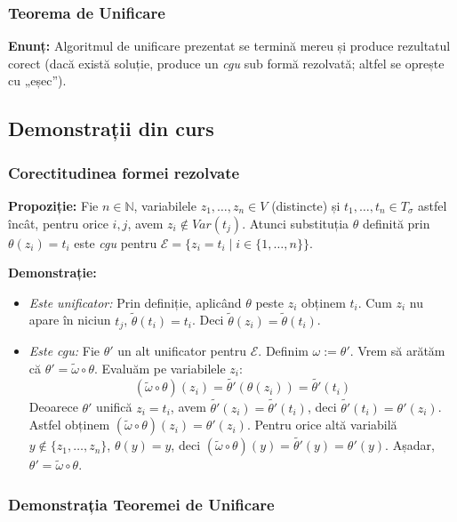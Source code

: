 \subsubsection{Teorema de Unificare}
\textbf{Enunț:} Algoritmul de unificare prezentat se termină mereu și produce rezultatul corect (dacă există soluție, produce un \textit{cgu} sub formă rezolvată; altfel se oprește cu „eșec”).

\subsection{Demonstrații din curs}

\subsubsection{Corectitudinea formei rezolvate}

\textbf{Propoziție:} Fie $n \in \mathbb{N}$, variabilele $z_1, \dots, z_n \in V$ (distincte) și $t_1, \dots, t_n \in T_\sigma$ astfel încât, pentru orice $i, j$, avem $z_i \notin Var(t_j)$. Atunci substituția $\theta$ definită prin $\theta(z_i) = t_i$ este \textit{cgu} pentru $\mathcal{E} = \{z_i = t_i \mid i \in \{1, \dots, n\} \}$.

\textbf{Demonstrație:}
\begin{itemize}
	\item \textit{Este unificator:} Prin definiție, aplicând $\theta$ peste $z_i$ obținem $t_i$. Cum $z_i$ nu apare în niciun $t_j$, $\tilde{\theta}(t_i) = t_i$. Deci $\tilde{\theta}(z_i) = \tilde{\theta}(t_i)$.
	\item \textit{Este cgu:} Fie $\theta'$ un alt unificator pentru $\mathcal{E}$. Definim $\omega := \theta'$. Vrem să arătăm că $\theta' = \tilde{\omega} \circ \theta$.
	      Evaluăm pe variabilele $z_i$:
	      $$(\tilde{\omega} \circ \theta)(z_i) = \tilde{\theta'}(\theta(z_i)) = \tilde{\theta'}(t_i)$$
	      Deoarece $\theta'$ unifică $z_i = t_i$, avem $\tilde{\theta'}(z_i) = \tilde{\theta'}(t_i)$, deci $\tilde{\theta'}(t_i) = \theta'(z_i)$. Astfel obținem $(\tilde{\omega} \circ \theta)(z_i) = \theta'(z_i)$.
	      Pentru orice altă variabilă $y \notin \{z_1, \dots, z_n\}$, $\theta(y) = y$, deci $(\tilde{\omega} \circ \theta)(y) = \tilde{\theta'}(y) = \theta'(y)$. Așadar, $\theta' = \tilde{\omega} \circ \theta$.
\end{itemize}

\subsubsection{Demonstrația Teoremei de Unificare}

